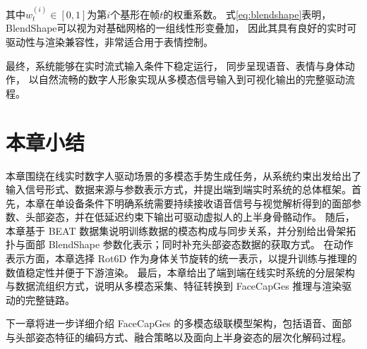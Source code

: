 其中$w_t^{(i)}\in[0,1]$为第$i$个基形在帧$t$的权重系数。
式\eqref{eq:blendshape}表明，BlendShape可以视为对基础网格的一组线性形变叠加，
因此其具有良好的实时可驱动性与渲染兼容性，非常适合用于表情控制。

最终，系统能够在实时流式输入条件下稳定运行，
同步呈现语音、表情与身体动作，
以自然流畅的数字人形象实现从多模态信号输入到可视化输出的完整驱动流程。

\section{本章小结}
本章围绕在线实时数字人驱动场景的多模态手势生成任务，从系统约束出发给出了输入信号形式、数据来源与参数表示方式，并提出端到端实时系统的总体框架。首先，本章在单设备条件下明确系统需要持续接收语音信号与视觉解析得到的面部参数、头部姿态，并在低延迟约束下输出可驱动虚拟人的上半身骨骼动作。 
随后，本章基于 BEAT 数据集说明训练数据的模态构成与同步关系，并分别给出骨架拓扑与面部 BlendShape 参数化表示；同时补充头部姿态数据的获取方式。
在动作表示方面，本章选择 Rot6D 作为身体关节旋转的统一表示，以提升训练与推理的数值稳定性并便于下游渲染。 
最后，本章给出了端到端在线实时系统的分层架构与数据流组织方式，说明从多模态采集、特征转换到 FaceCapGes 推理与渲染驱动的完整链路。

下一章将进一步详细介绍 FaceCapGes 的多模态级联模型架构，包括语音、面部与头部姿态特征的编码方式、融合策略以及面向上半身姿态的层次化解码过程。

